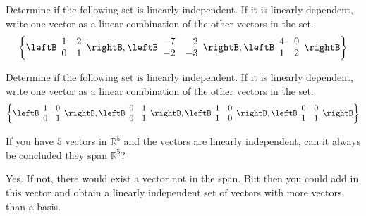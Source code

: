 \begin{enumialphparenastyle}
\begin{ex} Determine if the following set is linearly independent. If it is linearly dependent, write one vector as a linear combination of the other vectors in the set. 
\[
\left\{ \leftB \begin{array}{rr}
1 & 2 \\
0 & 1  
\end{array} \rightB, \leftB \begin{array}{rr}
-7 & 2 \\
-2 & -3  
\end{array} \rightB, \leftB \begin{array}{rr}
4 & 0 \\
1 & 2  
\end{array} \rightB
 \right\}
\]
\end{ex}

\begin{ex} Determine if the following set is linearly independent. If it is linearly dependent, write one vector as a linear combination of the other vectors in the set. 
\[
\left\{ \leftB \begin{array}{rr}
1 & 0 \\
0 & 1  
\end{array} \rightB, \leftB \begin{array}{rr}
0 & 1 \\
0 & 1  
\end{array} \rightB, \leftB \begin{array}{rr}
1 & 0 \\
1 & 0  
\end{array} \rightB, \leftB \begin{array}{rr}
0 & 0 \\
1 & 1 
\end{array} \rightB
 \right\}
\]
\end{ex}

\begin{ex} If you have $5$ vectors in $\mathbb{R}^{5}$ and the vectors are
linearly independent, can it always be concluded they span $\mathbb{R}^{5}?$ 
\begin{sol}
Yes. If not, there would exist a vector not in the span. But then
you could add in this vector and obtain a linearly independent set of
vectors with more vectors than a basis.
\end{sol}
\end{ex}


\end{enumialphparenastyle}
